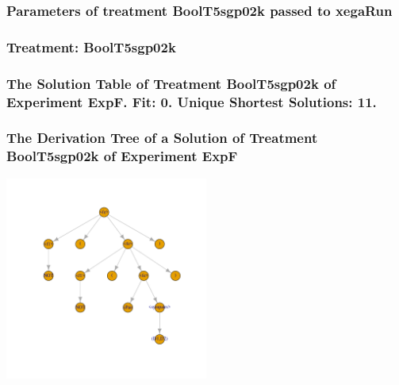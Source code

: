 \documentclass[18pt,c]{beamer}
\begin{document}

 \begin{frame}
 \fontsize{8pt}{9pt}\selectfont
 \frametitle{  Parameters of treatment BoolT5sgp02k passed to xegaRun
 }

 \label{ExpFtParmTable003.tex}  
 \end{frame}

 \begin{frame}
 \fontsize{8pt}{9pt}\selectfont
 \frametitle{ Treatment: BoolT5sgp02k }

 \label{ExpFStatsTable006.tex}  
 \end{frame}

 \begin{frame}
 \fontsize{8pt}{9pt}\selectfont
 \frametitle{ The Solution Table of Treatment BoolT5sgp02k of Experiment ExpF. Fit: 0. Unique Shortest Solutions: 11. }

 \label{ExpFSolutionTable000.tex}  
 \end{frame}

 \begin{frame}
 \frametitle{ The Derivation Tree of a Solution of Treatment BoolT5sgp02k of Experiment ExpF }
 \begin{center}
\includegraphics[width=0.5\textwidth, angle=0]
{ExpFDerivationTreeFigure000.pdf}
 \end{center}
 \label{report/ExpFDerivationTreeFigure000.pdf}  
 \end{frame}
\end{document}
